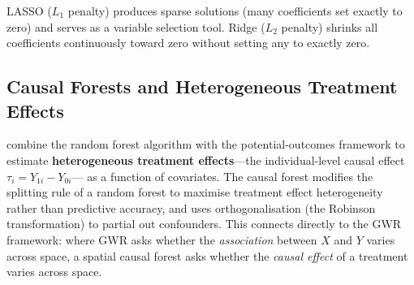 LASSO ($L_1$ penalty) produces sparse solutions (many coefficients set
exactly to zero) and serves as a variable selection tool. Ridge ($L_2$
penalty) shrinks all coefficients continuously toward zero without setting
any to exactly zero.

\subsection{Causal Forests and Heterogeneous Treatment Effects}

\citet{Wager2018} combine the random forest algorithm with the
potential-outcomes framework to estimate
\textbf{heterogeneous treatment effects}---the individual-level causal effect $\tau_i = Y_{1i} - Y_{0i}$---
as a function of covariates. The causal forest modifies the splitting rule of
a random forest to maximise treatment effect heterogeneity rather than
predictive accuracy, and uses orthogonalisation (the Robinson transformation)
to partial out confounders. This connects directly to the GWR framework:
where GWR asks whether the \emph{association} between $X$ and $Y$ varies
across space, a spatial causal forest asks whether the \emph{causal effect}
of a treatment varies across space.

\renewcommand\bibname{Further reading}
\begin{subappendices}


\end{subappendices}
